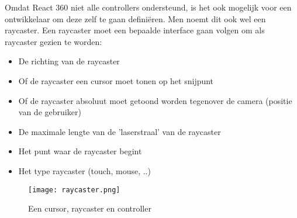Omdat React 360 niet alle controllers ondersteund, is het ook mogelijk voor een ontwikkelaar om deze zelf te gaan definiëren. Men noemt dit ook wel een raycaster. Een raycaster moet een bepaalde interface gaan volgen om als raycaster gezien te worden:

\begin{itemize}
	\item De richting van de raycaster
	\item Of de raycaster een cursor moet tonen op het snijpunt
	\item Of de raycaster absoluut moet getoond worden tegenover de camera (positie van de gebruiker)
	\item De maximale lengte van de 'laserstraal' van de raycaster
	\item Het punt waar de raycaster begint
	\item Het type raycaster (touch, mouse, ..)
\end{itemize}

\begin{figure}[h]
	\centering
	\texttt{[image: raycaster.png]}
	\caption{Een cursor, raycaster en controller}
	\label{fig:raycaster}
\end{figure}
